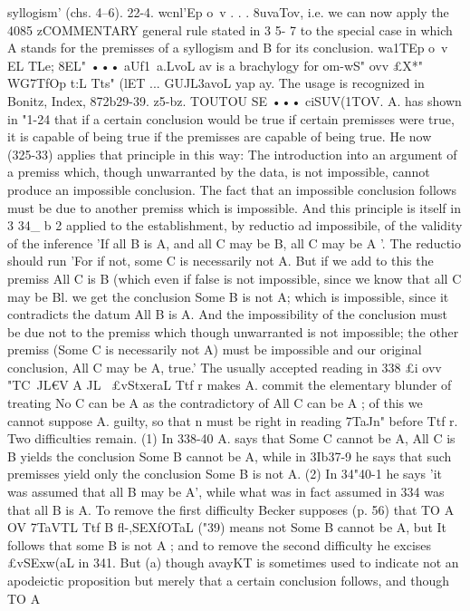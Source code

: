 {{{{syllogism' (chs. 4--6).
22-4. wcnl'Ep o~v . . . 8uvaTov, i.e. we can now apply the
4085
zCOMMENTARY
general rule stated in 3 5- 7 to the special case in which A stands
for the premisses of a syllogism and B for its conclusion.
wa1TEp o~v EL TLe; 8EL" ••• aUf1~a.LvoL av is a brachylogy for
om-wS" ovv £X*" WG7TfOp t:L Tts" (lE{T} ... GUJL{3a{voL yap ay. The usage is
recognized in Bonitz, Index, 872b29-39.
z5-bz. TOUTOU SE ••• ciSUV(1TOV. A. has shown in "1-24 that
if a certain conclusion would be true if certain premisses were
true, it is capable of being true if the premisses are capable of
being true. He now (325-33) applies that principle in this way:
The introduction into an argument of a premiss which, though
unwarranted by the data, is not impossible, cannot produce an
impossible conclusion. The fact that an impossible conclusion
follows must be due to another premiss which is impossible.
And this principle is itself in 3 34_ b 2 applied to the establishment,
by reductio ad impossibile, of the validity of the inference 'If all
B is A, and all C may be B, all C may be A '. The reductio should
run 'For if not, some C is necessarily not A. But if we add to this
the premiss All C is B (which even if false is not impossible, since
we know that all C may be Bl. we get the conclusion Some B
is not A; which is impossible, since it contradicts the datum All
B is A. And the impossibility of the conclusion must be due not
to the premiss which though unwarranted is not impossible; the
other premiss (Some C is necessarily not A) must be impossible
and our original conclusion, All C may be A, true.'
The usually accepted reading in 338 £i ovv "TC\ JL€V A JL~ £vStxeraL
Ttf r makes A. commit the elementary blunder of treating No C
can be A as the contradictory of All C can be A ; of this we cannot
suppose A. guilty, so that n must be right in reading 7TaJn"{ before
Ttf r. Two difficulties remain. (1) In 338-40 A. says that Some C
cannot be A, All C is B yields the conclusion Some B cannot be
A, while in 3Ib37-9 he says that such premisses yield only the
conclusion Some B is not A. (2) In 34"40-1 he says 'it was assumed
that all B may be A', while what was in fact assumed in 334 was
that all B is A. To remove the first difficulty Becker supposes
(p. 56) that TO A OV 7TaVTL Ttf B fl-,SEXfOTaL ("39) means not Some B
cannot be A, but It follows that some B is not A ; and to remove
the second difficulty he excises £vSExw(}aL in 341. But (a) though
avayKT} is sometimes used to indicate not an apodeictic proposition
but merely that a certain conclusion follows, and though TO A
}}}}}
